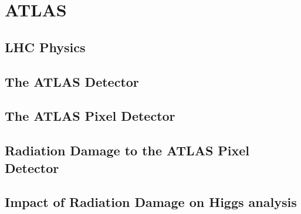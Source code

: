 \chapter{ATLAS}
\label{chap:ATLAS}

\section{LHC Physics}

\section{The ATLAS Detector}

\section{The ATLAS Pixel Detector}

\section{Radiation Damage to the ATLAS Pixel Detector}
\label{sec:digitizer}

\section{Impact of Radiation Damage on Higgs analysis}